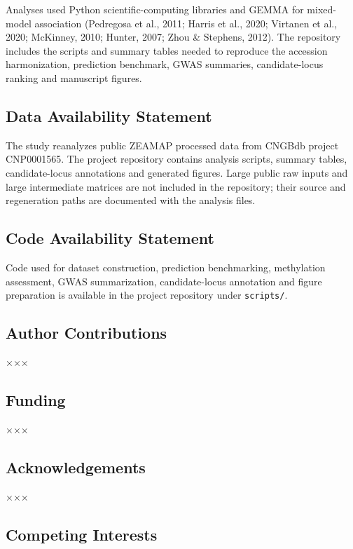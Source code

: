 \documentclass[
]{article}
\begin{document}
Analyses used Python scientific-computing libraries and GEMMA for
mixed-model association (Pedregosa et al., 2011; Harris et al., 2020;
Virtanen et al., 2020; McKinney, 2010; Hunter, 2007; Zhou \& Stephens,
2012). The repository includes the scripts and summary tables needed to
reproduce the accession harmonization, prediction benchmark, GWAS
summaries, candidate-locus ranking and manuscript figures.

\subsection{Data Availability
Statement}\label{data-availability-statement}

The study reanalyzes public ZEAMAP processed data from CNGBdb project
CNP0001565. The project repository contains analysis scripts, summary
tables, candidate-locus annotations and generated figures. Large public
raw inputs and large intermediate matrices are not included in the
repository; their source and regeneration paths are documented with the
analysis files.

\subsection{Code Availability
Statement}\label{code-availability-statement}

Code used for dataset construction, prediction benchmarking, methylation
assessment, GWAS summarization, candidate-locus annotation and figure
preparation is available in the project repository under
\texttt{scripts/}.

\subsection{Author Contributions}\label{author-contributions}

×××

\subsection{Funding}\label{funding}

×××

\subsection{Acknowledgements}\label{acknowledgements}

×××

\subsection{Competing Interests}\label{competing-interests}
\end{document}
